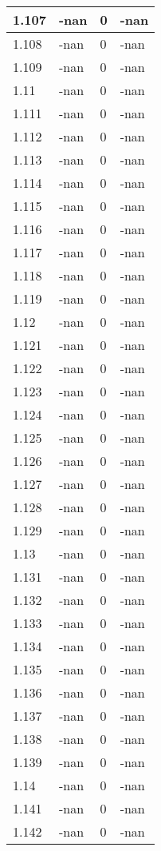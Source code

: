 \documentclass[a4paper,14pt]{extarticle}
\begin{document}
\begin{longtable}{||m{3cm}||m{3cm}|m{3cm}||m{3cm}||}
\hline
1.107 & -nan & 0 & -nan\\
\hline
1.108 & -nan & 0 & -nan\\
\hline
1.109 & -nan & 0 & -nan\\
\hline
1.11 & -nan & 0 & -nan\\
\hline
1.111 & -nan & 0 & -nan\\
\hline
1.112 & -nan & 0 & -nan\\
\hline
1.113 & -nan & 0 & -nan\\
\hline
1.114 & -nan & 0 & -nan\\
\hline
1.115 & -nan & 0 & -nan\\
\hline
1.116 & -nan & 0 & -nan\\
\hline
1.117 & -nan & 0 & -nan\\
\hline
1.118 & -nan & 0 & -nan\\
\hline
1.119 & -nan & 0 & -nan\\
\hline
1.12 & -nan & 0 & -nan\\
\hline
1.121 & -nan & 0 & -nan\\
\hline
1.122 & -nan & 0 & -nan\\
\hline
1.123 & -nan & 0 & -nan\\
\hline
1.124 & -nan & 0 & -nan\\
\hline
1.125 & -nan & 0 & -nan\\
\hline
1.126 & -nan & 0 & -nan\\
\hline
1.127 & -nan & 0 & -nan\\
\hline
1.128 & -nan & 0 & -nan\\
\hline
1.129 & -nan & 0 & -nan\\
\hline
1.13 & -nan & 0 & -nan\\
\hline
1.131 & -nan & 0 & -nan\\
\hline
1.132 & -nan & 0 & -nan\\
\hline
1.133 & -nan & 0 & -nan\\
\hline
1.134 & -nan & 0 & -nan\\
\hline
1.135 & -nan & 0 & -nan\\
\hline
1.136 & -nan & 0 & -nan\\
\hline
1.137 & -nan & 0 & -nan\\
\hline
1.138 & -nan & 0 & -nan\\
\hline
1.139 & -nan & 0 & -nan\\
\hline
1.14 & -nan & 0 & -nan\\
\hline
1.141 & -nan & 0 & -nan\\
\hline
1.142 & -nan & 0 & -nan\\

\end{longtable}
\end{document}
